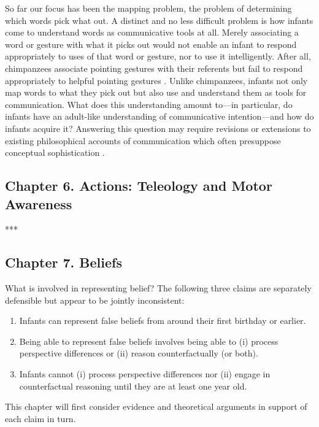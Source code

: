 \documentclass[12pt,\papersize]{extarticle}
\begin{document}
So far our focus has been the mapping problem, the problem of determining which words pick what out. 
A distinct and no less difficult problem is how infants come to understand words as communicative tools at all.
Merely associating a word or gesture with what it picks out would not enable an infant to respond appropriately to uses of that word or gesture, nor to use it intelligently. 
After all, chimpanzees associate pointing gestures with their referents \citep[][p.\ 6]{Moll:2007gu} but fail to respond appropriately to helpful pointing gestures \citep{hare_chimpanzees_2004}. 
Unlike chimpanzees, infants not only map words to what they pick out but also use and understand them as tools for communication. 
What does this understanding amount to---in particular, do infants have an adult-like understanding of communicative intention---and how do infants acquire it?
Answering this question may require revisions or extensions to existing philosophical accounts of communication which often presuppose conceptual sophistication \citep[e.g.][]{Grice:1957kg}.




\subsection{Chapter 6. Actions: Teleology and Motor Awareness}
\label{ch:actions}
***


\subsection{Chapter 7. Beliefs}
What is involved in representing belief?
The following three claims are separately defensible but appear to be jointly inconsistent: 
%
\begin{enumerate}
\item Infants can represent false beliefs from around their first birthday or earlier. \label{infant_fb}
%
\item  \label{fb_is_perspectives}  Being able to represent false beliefs involves being able to  (i) process perspective differences or (ii) reason counterfactually (or both).
%
\item Infants cannot (i) process perspective differences nor (ii) engage in counterfactual reasoning until they are at least one year old.  \label{infant_perspectives}
%
\end{enumerate}
%
This chapter will first consider evidence and theoretical arguments in support of each claim in turn.  
\end{document}
